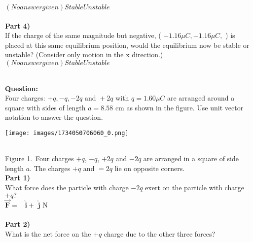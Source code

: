 \documentclass[addpoints,12pt, margin-left=35px]{exam}
\begin{document}
$(No answer given)StableUnstable$ \\

\\

\textbf{Part 4)}\\

If the charge of the same magnitude but negative, ( $−1.16μC,- {1.16} \mu C,$ ) is placed at this same equilibrium position, would the equilibrium now be stable or unstable? (Consider only motion in the x direction.)\\

$(No answer given)StableUnstable$ \\

\\

\newpage

\textbf{Question:}\\

Four charges: $+q, -q,-2q \text{ and } +2q$ with $q = {1.60} \mu C$ are arranged around a square with sides of length $a = {8.58} \text{ cm}$ as shown in the figure. Use unit vector notation to answer the question.\\

\begin{center}
\texttt{[image: images/1734050706060\_0.png]}
\end{center}\\

Figure 1. Four charges $+q$, $-q$, $+2q$ and $-2q$ are arranged in a square of side length $a$. The charges $+q$ and $=2q$ lie on opposite corners.\\

\textbf{Part 1)}\\

What force does the particle with charge $-2q$ exert on the particle with charge $+q?$\\

$\mathbf{\vec{F}} = $  \underline{\hspace{3cm}}  $ \mathbf{\hat{i}} + $  \underline{\hspace{3cm}}  $\mathbf{\hat{j}} \text{ N}$ \\

\\

\textbf{Part 2)}\\

What is the net force on the $+ q$ charge due to the other three forces?\\
\end{document}
